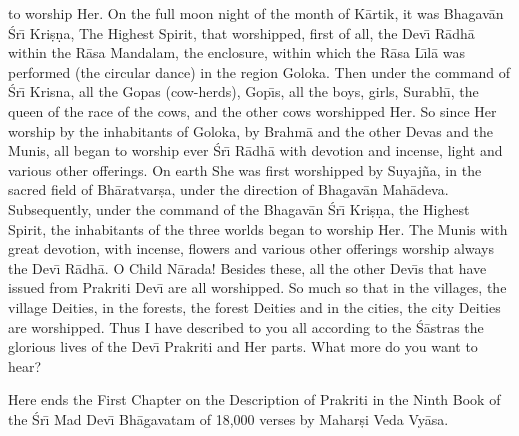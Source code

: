to worship Her. On the full moon night of the month of K\=artik, it was Bhagav\=an \'Sr\={\i} Kri\d{s}\d{n}a, The Highest Spirit, that worshipped, first of all, the Dev\={\i} R\=adh\=a within the R\=asa Mandalam, the enclosure, within which the R\=asa L\={\i}l\=a was performed (the circular dance) in the region Goloka. Then under the command of \'Sr\={\i} Krisna, all the Gopas (cow-herds), Gop\={\i}s, all the boys, girls, Surabh\={\i}, the queen of the race of the cows, and the other cows worshipped Her. So since Her worship by the inhabitants of Goloka, by Brahm\=a and the other Devas and the Munis, all began to worship ever \'Sr\={\i} R\=adh\=a with devotion and incense, light and various other offerings. On earth She was first worshipped by Suyaj\~na, in the sacred field of Bh\=aratvar\d{s}a, under the direction of Bhagav\=an Mah\=adeva. Subsequently, under the command of the Bhagav\=an \'Sr\={\i} Kri\d{s}\d{n}a, the Highest Spirit, the inhabitants of the three worlds began to worship Her. The Munis with great devotion, with incense, flowers and various other offerings worship always the Dev\={\i} R\=adh\=a. O Child N\=arada! Besides these, all the other Dev\={\i}s that have issued from Prakriti Dev\={\i} are all worshipped. So much so that in the villages, the village Deities, in the forests, the forest Deities and in the cities, the city Deities are worshipped. Thus I have described to you all according to the \'S\=astras the glorious lives of the Dev\={\i} Prakriti and Her parts. What more do you want to hear?

Here ends the First Chapter on the Description of Prakriti in the Ninth Book of the \'Sr\={\i} Mad Dev\={\i} Bh\=agavatam of 18,000 verses by Mahar\d{s}i Veda Vy\=asa.



